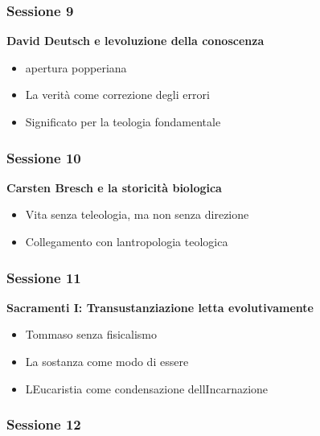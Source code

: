 \documentclass[
]{article}
\begin{document}
\subsubsection{\texorpdfstring{\textbf{Sessione 9}}{Sessione 9}}\label{sessione-9}

\textbf{David Deutsch e l\textquotesingle evoluzione della conoscenza}

\begin{itemize}
\item
  apertura popperiana
\item
  La verità come correzione degli errori
\item
  Significato per la teologia fondamentale
\end{itemize}

\subsubsection{\texorpdfstring{\textbf{Sessione 10}}{Sessione 10}}\label{sessione-10}

\textbf{Carsten Bresch e la storicità biologica}

\begin{itemize}
\item
  Vita senza teleologia, ma non senza direzione
\item
  Collegamento con l\textquotesingle antropologia teologica
\end{itemize}

\subsubsection{\texorpdfstring{\textbf{Sessione 11}}{Sessione 11}}\label{sessione-11}

\textbf{Sacramenti I: Transustanziazione letta evolutivamente}

\begin{itemize}
\item
  Tommaso senza fisicalismo
\item
  La sostanza come modo di essere
\item
  L\textquotesingle Eucaristia come condensazione dell\textquotesingle Incarnazione
\end{itemize}

\subsubsection{\texorpdfstring{\textbf{Sessione 12}}{Sessione 12}}\label{sessione-12}
\end{document}
